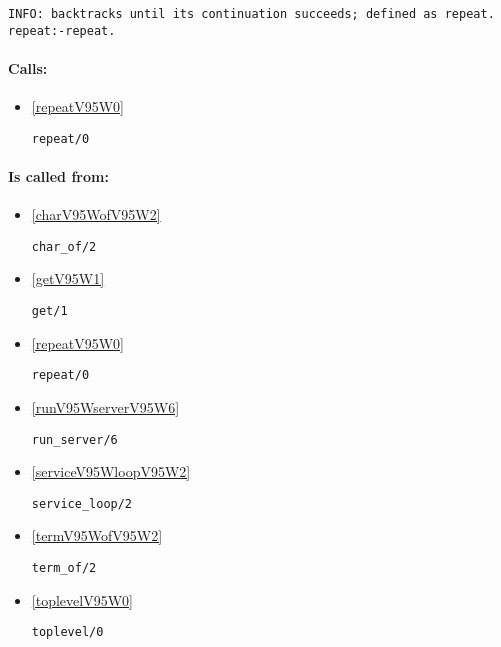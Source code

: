 {\small \begin{verbatim}
INFO: backtracks until its continuation succeeds; defined as repeat. repeat:-repeat. 

\end{verbatim}}
\paragraph{Calls:} 
\begin{itemize}
\item \ref{repeatV95W0} 
\begin{verbatim}
repeat/0
\end{verbatim}

\end{itemize}
\paragraph{Is called from:} 
\begin{itemize}
\item \ref{charV95WofV95W2} 
\begin{verbatim}
char_of/2
\end{verbatim}

\item \ref{getV95W1} 
\begin{verbatim}
get/1
\end{verbatim}

\item \ref{repeatV95W0} 
\begin{verbatim}
repeat/0
\end{verbatim}

\item \ref{runV95WserverV95W6} 
\begin{verbatim}
run_server/6
\end{verbatim}

\item \ref{serviceV95WloopV95W2} 
\begin{verbatim}
service_loop/2
\end{verbatim}

\item \ref{termV95WofV95W2} 
\begin{verbatim}
term_of/2
\end{verbatim}

\item \ref{toplevelV95W0} 
\begin{verbatim}
toplevel/0
\end{verbatim}

\end{itemize}

